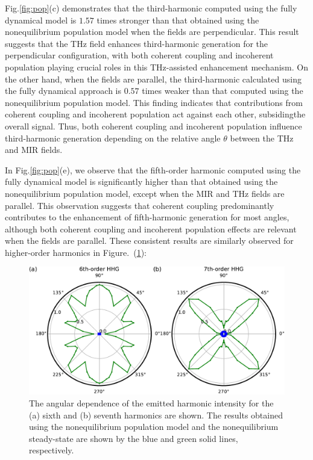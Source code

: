 Fig.\ref{fig:pop}(c) demonstrates that the third-harmonic  computed using the fully dynamical model is $1.57$ times stronger than that obtained using the nonequilibrium population model when the fields are perpendicular. This result suggests that the THz field enhances third-harmonic generation for the perpendicular configuration, with both coherent coupling and incoherent population playing crucial roles in this THz-assisted enhancement mechanism. On the other hand, when the fields are parallel, the third-harmonic  calculated using the fully dynamical approach is $0.57$ times weaker than that computed using the nonequilibrium population model. This finding indicates that contributions from coherent coupling and incoherent population act against each other, subsidingthe overall signal. Thus, both coherent coupling and incoherent population influence third-harmonic generation depending on the relative angle $\theta$ between the THz and MIR fields.

In Fig.\ref{fig:pop}(e), we observe that the fifth-order harmonic  computed using the fully dynamical model is significantly higher than that obtained using the nonequilibrium population model, except when the MIR and THz fields are parallel. This observation suggests that coherent coupling predominantly contributes to the enhancement of fifth-harmonic generation for most angles, although both coherent coupling and incoherent population effects are relevant when the fields are parallel. These consistent results are similarly observed for higher-order harmonics in Figure.~(\ref{fig:SI_pop}):
\begin{figure}[tb]
	\center
	\includegraphics[width=0.8\linewidth]{pic/SI_pop.pdf}
	\caption{\label{fig:SI_pop}
		The angular dependence of the emitted harmonic intensity for the (a) sixth and (b) seventh harmonics are shown. The results obtained using the nonequilibrium population model and the nonequilibrium steady-state are shown by the blue and green solid lines, respectively.
	}
\end{figure}

